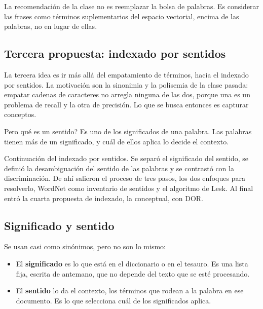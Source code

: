 \documentclass[11pt,letterpaper]{article}
\begin{document}
\begin{idea}
    La recomendación de la clase no es reemplazar la bolsa de
    palabras. Es considerar las frases como términos suplementarios
    del espacio vectorial, encima de las palabras, no en lugar de
    ellas.
\end{idea}

\subsection*{Tercera propuesta: indexado por sentidos}

La tercera idea es ir más allá del empatamiento de términos, hacia el
indexado por sentidos. La motivación son la sinonimia y la polisemia
de la clase pasada: empatar cadenas de caracteres no arregla ninguna
de las dos, porque una es un problema de recall y la otra de
precisión. Lo que se busca entonces es capturar conceptos.

Pero qué es un sentido? Es uno de los significados de una palabra.
Las palabras tienen más de un significado, y cuál de ellos aplica lo
decide el contexto.





\newpage


\begin{quick_sum}
    Continuación del indexado por sentidos. Se separó el significado
    del sentido, se definió la desambiguación del sentido de las
    palabras y se contrastó con la discriminación. De ahí salieron el
    proceso de tres pasos, los dos enfoques para resolverlo, WordNet
    como inventario de sentidos y el algoritmo de Lesk. Al final entró
    la cuarta propuesta de indexado, la conceptual, con DOR.
\end{quick_sum}

\subsection*{Significado y sentido}

Se usan casi como sinónimos, pero no son lo mismo:

\begin{itemize}[itemsep=0.2em]
    \item El \textbf{significado} es lo que está en el diccionario o
          en el tesauro. Es una lista fija, escrita de antemano, que
          no depende del texto que se esté procesando.
    \item El \textbf{sentido} lo da el contexto, los términos que
          rodean a la palabra en ese documento. Es lo que selecciona
          cuál de los significados aplica.
\end{itemize}
\end{document}
